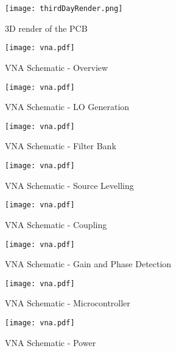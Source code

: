 \begin{landscape}
	
	\begin{figure}
		\centering
		\texttt{[image: thirdDayRender.png]}
		\caption{3D render of the PCB}
		\label{fig:pcb_render}
	\end{figure}

	\begin{figure}
		\centering
		\texttt{[image: vna.pdf]}
		\caption{VNA Schematic - Overview}
		\label{fig:vna_schematic_overview}
	\end{figure}

	\begin{figure}
		\centering
		\texttt{[image: vna.pdf]}
		\caption{VNA Schematic - LO Generation}
		\label{fig:vna_schematic_lo}
	\end{figure}
	
	\begin{figure}
		\centering
		\texttt{[image: vna.pdf]}
		\caption{VNA Schematic - Filter Bank}
		\label{fig:vna_schematic_filter}
	\end{figure}
	
	\begin{figure}
		\centering
		\texttt{[image: vna.pdf]}
		\caption{VNA Schematic - Source Levelling}
		\label{fig:vna_schematic_source_levelling}
	\end{figure}
	
	\begin{figure}
		\centering
		\texttt{[image: vna.pdf]}
		\caption{VNA Schematic - Coupling}
		\label{fig:vna_schematic_coupling}
	\end{figure}
	
	\begin{figure}
		\centering
		\texttt{[image: vna.pdf]}
		\caption{VNA Schematic - Gain and Phase Detection}
		\label{fig:vna_schematic_ad8302}
	\end{figure}
	
	\begin{figure}
		\centering
		\texttt{[image: vna.pdf]}
		\caption{VNA Schematic - Microcontroller}
		\label{fig:vna_schematic_micro}
	\end{figure}
	
	\begin{figure}
		\centering
		\texttt{[image: vna.pdf]}
		\caption{VNA Schematic - Power}
		\label{fig:vna_schematic_power}
	\end{figure}
\end{landscape}